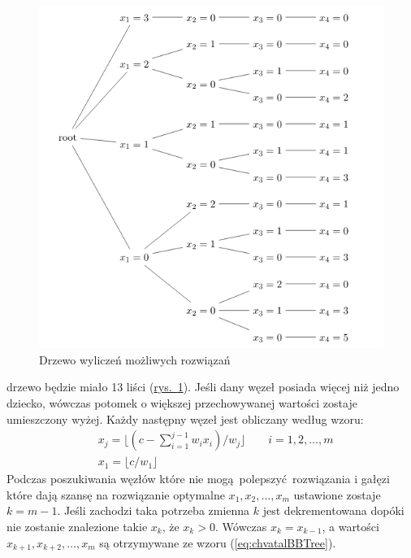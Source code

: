 \begin{figure}
  \includegraphics[width=\textwidth,center]{../image/chvatal_book_sample.png}
  \caption{Drzewo wyliczeń możliwych rozwiązań}
  \label{fig:chvatalBBTree}
\end{figure}


\noindent drzewo będzie miało 13 liści (\hyperref[fig:chvatalBBTree]{rys.~\ref*{fig:chvatalBBTree}}). Jeśli dany węzeł posiada więcej niż jedno dziecko, wówczas potomek o większej przechowywanej wartości zostaje umieszczony wyżej. Każdy następny węzeł jest obliczany według wzoru:
\begin{equation}\label{eq:chvatalBBTree}
  \begin{aligned}
    & x_j = \lfloor{(c - \sum_{i=1}^{j-1}w_ix_i)/w_j}\rfloor \qquad i = 1,2,\dots,m \\
    & x_1 = \lfloor{c/w_1}\rfloor
  \end{aligned}
\end{equation}
Podczas poszukiwania węzłów które nie mogą polepszyć rozwiązania i gałęzi które dają szansę na rozwiązanie optymalne $x_1,x_2,\dots,x_m$ ustawione zostaje $k = m-1$. Jeśli zachodzi taka potrzeba zmienna $k$ jest dekrementowana dopóki nie zostanie znalezione takie $x_k$, że $x_k > 0$. Wówczas $x_k = x_{k-1}$, a wartości $x_{k+1}, x_{k+2}, \dots,x_m$ są otrzymywane ze wzoru (\ref{eq:chvatalBBTree}).

